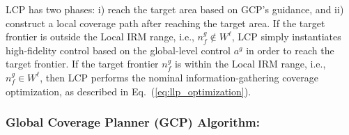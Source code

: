 \documentclass[letterpaper]{article} %
\newcommand{\phdone}[1]{} %
\begin{document}
LCP has two phases: i) reach the target area based on GCP's guidance, and ii) construct a local coverage path after reaching the target area.
If the target frontier is outside the Local IRM range, i.e., $n^g_f \notin W^\ell$, LCP simply instantiates high-fidelity control  based on the global-level control $a^g$ in order to reach the target frontier.
If the target frontier $n^g_f$ is within the Local IRM range, i.e., $n^g_f \in W^\ell$, then LCP performs the nominal information-gathering coverage optimization, as described in Eq.~(\ref{eq:llp_optimization}).


\subsubsection{Global Coverage Planner (GCP) Algorithm:}\label{sssec:GCP} \hfill
\vspace{-0.25pt}
\end{document}
